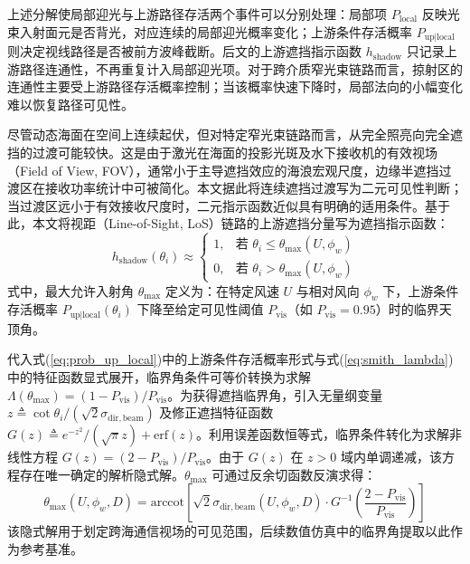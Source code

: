 上述分解使局部迎光与上游路径存活两个事件可以分别处理：局部项 $P_{\mathrm{local}}$ 反映光束入射面元是否背光，对应连续的局部迎光概率变化；上游条件存活概率 $P_{\mathrm{up}|\mathrm{local}}$ 则决定视线路径是否被前方波峰截断。后文的上游遮挡指示函数 $h_{\mathrm{shadow}}$ 只记录上游路径连通性，不再重复计入局部迎光项。对于跨介质窄光束链路而言，掠射区的连通性主要受上游路径存活概率控制；当该概率快速下降时，局部法向的小幅变化难以恢复路径可见性。

尽管动态海面在空间上连续起伏，但对特定窄光束链路而言，从完全照亮向完全遮挡的过渡可能较快。这是由于激光在海面的投影光斑及水下接收机的有效视场（Field of View, FOV），通常小于主导遮挡效应的海浪宏观尺度，边缘半遮挡过渡区在接收功率统计中可被简化。本文据此将连续遮挡过渡写为二元可见性判断；当过渡区远小于有效接收尺度时，二元指示函数近似具有明确的适用条件。基于此，本文将视距（Line-of-Sight, LoS）链路的上游遮挡分量写为遮挡指示函数：
\begin{equation}
	h_{\mathrm{shadow}}(\theta_i) \approx 
	\begin{cases} 
		1, & \text{若 } \theta_i \le \theta_{\max}(U, \phi_w) \\ 
		0, & \text{若 } \theta_i > \theta_{\max}(U, \phi_w) 
	\end{cases}
	\label{eq:hard_truncation}
\end{equation}
式中，最大允许入射角 $\theta_{\max}$ 定义为：在特定风速 $U$ 与相对风向 $\phi_w$ 下，上游条件存活概率 $P_{\mathrm{up}|\mathrm{local}}(\theta_i)$ 下降至给定可见性阈值 $P_{\mathrm{vis}}$（如 $P_{\mathrm{vis}}=0.95$）时的临界天顶角。

代入式(\ref{eq:prob_up_local})中的上游条件存活概率形式与式(\ref{eq:smith_lambda})中的特征函数显式展开，临界角条件可等价转换为求解 $\Lambda(\theta_{\max}) = (1 - P_{\mathrm{vis}}) / P_{\mathrm{vis}}$。为获得遮挡临界角，引入无量纲变量 $z \triangleq \cot\theta_i / (\sqrt{2}\sigma_{\mathrm{dir},\mathrm{beam}})$ 及修正遮挡特征函数 $G(z) \triangleq e^{-z^2}/(\sqrt{\pi}z) + \mathrm{erf}(z)$。利用误差函数恒等式，临界条件转化为求解非线性方程 $G(z) = (2 - P_{\mathrm{vis}}) / P_{\mathrm{vis}}$。由于 $G(z)$ 在 $z>0$ 域内单调递减，该方程存在唯一确定的解析隐式解。$\theta_{\max}$ 可通过反余切函数反演求得：
\begin{equation}
	\theta_{\max}(U, \phi_w,D) = \mathrm{arccot}\left[ \sqrt{2}\sigma_{\mathrm{dir},\mathrm{beam}}(U, \phi_w,D) \cdot G^{-1}\left( \frac{2 - P_{\mathrm{vis}}}{P_{\mathrm{vis}}} \right) \right]
	\label{eq:theta_max_analytic}
\end{equation}
该隐式解用于划定跨海通信视场的可见范围，后续数值仿真中的临界角提取以此作为参考基准。

